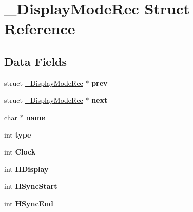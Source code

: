\hypertarget{struct__DisplayModeRec}{}\section{\+\_\+\+Display\+Mode\+Rec Struct Reference}
\label{struct__DisplayModeRec}
\subsection*{Data Fields}
\begin{DoxyCompactItemize}
\item 
\mbox{\label{struct__DisplayModeRec_ac3ab8178e7d31545864539604309b958}} 
struct \mbox{\hyperlink{struct__DisplayModeRec}{\+\_\+\+Display\+Mode\+Rec}} $\ast$ {\bfseries prev}
\item 
\mbox{\label{struct__DisplayModeRec_a171f95b1b130302cef953fa003d2ff63}} 
struct \mbox{\hyperlink{struct__DisplayModeRec}{\+\_\+\+Display\+Mode\+Rec}} $\ast$ {\bfseries next}
\item 
\mbox{\label{struct__DisplayModeRec_aacb0d247adbd69e6448196a251783e30}} 
char $\ast$ {\bfseries name}
\item 
\mbox{\label{struct__DisplayModeRec_accde37f68c0f747d5bb970548a5f6708}} 
int {\bfseries type}
\item 
\mbox{\label{struct__DisplayModeRec_a27209d572b5056bb9d642f092b99bc02}} 
int {\bfseries Clock}
\item 
\mbox{\label{struct__DisplayModeRec_aa013c04ba3d9ef927dc7d48943ceb4b9}} 
int {\bfseries H\+Display}
\item 
\mbox{\label{struct__DisplayModeRec_ae794e59d52cb0507f81e11b4bc16cae8}} 
int {\bfseries H\+Sync\+Start}
\item 
\mbox{\label{struct__DisplayModeRec_adfb448b1793c835701ca9e9cef9b269b}} 
int {\bfseries H\+Sync\+End}
\item 
\mbox{\label{struct__DisplayModeRec_aeb129028ff50618b6c7f3b7dd9f5632f}} 

\end{DoxyCompactItemize}
